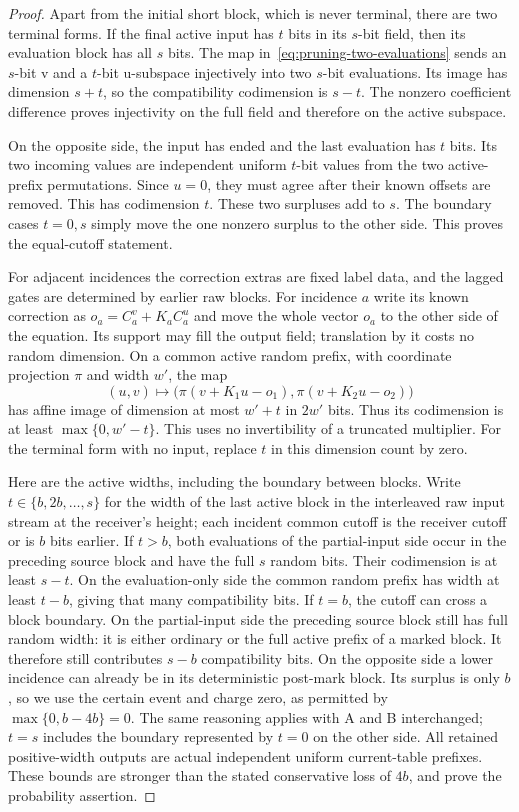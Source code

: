 \begin{proof}
Apart from the initial short block, which is never terminal, there
are two terminal forms.  If the final active input has $t$ bits in
its $s$-bit field, then its evaluation block has all $s$ bits.
The map in~\eqref{eq:pruning-two-evaluations} sends an $s$-bit v
and a $t$-bit u-subspace injectively into two $s$-bit evaluations.
Its image has dimension $s+t$, so the compatibility codimension is
$s-t$.  The nonzero coefficient difference proves injectivity on
the full field and therefore on the active subspace.

On the opposite side, the input has ended and the last evaluation
has $t$ bits.  Its two incoming values are independent uniform
$t$-bit values from the two active-prefix permutations.  Since
$u=0$, they must agree after their known offsets are removed.
This has codimension $t$.  These two surpluses add to $s$.
The boundary cases $t=0,s$ simply move the one nonzero surplus to
the other side.  This proves the equal-cutoff statement.

For adjacent incidences the correction extras are fixed label
data, and the lagged gates are determined by earlier raw blocks.
For incidence $a$ write its known correction as
$o_a=C_a^v+K_aC_a^u$ and move the whole vector $o_a$ to the other
side of the equation.  Its support may fill the output field;
translation by it costs no random dimension.  On a common active
random prefix, with coordinate projection $\pi$ and width $w'$, the
map
\[
 (u,v)\longmapsto
 \bigl(\pi(v+K_1u-o_1),\pi(v+K_2u-o_2)\bigr)
\]
has affine image of dimension at most $w'+t$ in $2w'$ bits.
Thus its codimension is at least $\max\{0,w'-t\}$.  This uses no
invertibility of a truncated multiplier.  For the terminal form
with no input, replace $t$ in this dimension count by zero.

Here are the active widths, including the boundary between blocks.
Write $t\in\{b,2b,\ldots,s\}$ for the width of the last active
block in the interleaved raw input stream at the receiver's height;
each incident common cutoff is the receiver cutoff or is $b$ bits
earlier.  If $t>b$, both evaluations of the
partial-input side occur in the preceding source block and have
the full $s$ random bits.  Their codimension is at least $s-t$.
On the evaluation-only side the common random prefix has width
at least $t-b$, giving that many compatibility bits.  If $t=b$,
the cutoff can cross a block boundary.  On the partial-input side
the preceding source block still has full random width: it is
either ordinary or the full active prefix of a marked block.
It therefore still contributes $s-b$ compatibility bits.  On the
opposite side a lower incidence can already be in its deterministic
post-mark block.  Its surplus is only $b$, so we use the certain
event and charge zero, as permitted by
$\max\{0,b-4b\}=0$.  The same reasoning applies with A and B
interchanged; $t=s$ includes the boundary represented by $t=0$
on the other side.  All retained positive-width outputs are
actual independent uniform current-table prefixes.  These bounds
are stronger than the stated conservative loss of $4b$, and prove
the probability assertion.
\end{proof}

